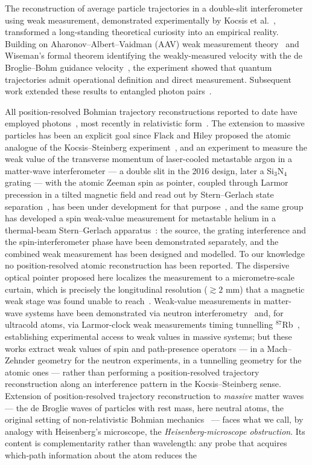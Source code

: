 \documentclass[11pt,a4paper]{article}
\begin{document}
The reconstruction of average particle trajectories in a double-slit interferometer using weak measurement, demonstrated experimentally by Kocsis et al.~\cite{Kocsis2011}, transformed a long-standing theoretical curiosity into an empirical reality. Building on Aharonov--Albert--Vaidman (AAV) weak measurement theory~\cite{AAV1988} and Wiseman's formal theorem identifying the weakly-measured velocity with the de Broglie--Bohm guidance velocity~\cite{Wiseman2007}, the experiment showed that quantum trajectories admit operational definition and direct measurement. Subsequent work extended these results to entangled photon pairs~\cite{Mahler2016, Xiao2017}.

All position-resolved Bohmian trajectory reconstructions reported to date have employed photons~\cite{Kocsis2011, Mahler2016, Xiao2017}, most recently in relativistic form~\cite{Wang2025}. The extension to massive particles has been an explicit goal since Flack and Hiley proposed the atomic analogue of the Kocsis--Steinberg experiment~\cite{FlackHiley2014}, and an experiment to measure the weak value of the transverse momentum of laser-cooled metastable argon in a matter-wave interferometer --- a double slit in the 2016 design, later a Si$_3$N$_4$ grating --- with the atomic Zeeman spin as pointer, coupled through Larmor precession in a tilted magnetic field and read out by Stern--Gerlach state separation~\cite{Morley2020}, has been under development for that purpose~\cite{Morley2016, Morley2020, Morley2021}, and the same group has developed a spin weak-value measurement for metastable helium in a thermal-beam Stern--Gerlach apparatus~\cite{Flack2018}: the source, the grating interference and the spin-interferometer phase have been demonstrated separately, and the combined weak measurement has been designed and modelled. To our knowledge no position-resolved atomic reconstruction has been reported. The dispersive optical pointer proposed here localizes the measurement to a micrometre-scale curtain, which is precisely the longitudinal resolution ($\gtrsim 2$ mm) that a magnetic weak stage was found unable to reach~\cite{Morley2020}. Weak-value measurements in matter-wave systems have been demonstrated via neutron interferometry~\cite{Sponar2015, Denkmayr2017, Lemmel2022} and, for ultracold atoms, via Larmor-clock weak measurements timing tunnelling $^{87}$Rb~\cite{Ramos2020, Spierings2021}, establishing experimental access to weak values in massive systems; but these works extract weak values of spin and path-presence operators --- in a Mach--Zehnder geometry for the neutron experiments, in a tunnelling geometry for the atomic ones --- rather than performing a position-resolved trajectory reconstruction along an interference pattern in the Kocsis--Steinberg sense. Extension of position-resolved trajectory reconstruction to \emph{massive} matter waves --- the de Broglie waves of particles with rest mass, here neutral atoms, the original setting of non-relativistic Bohmian mechanics~\cite{Bohm1952a, deBroglie1927, Holland1993} --- faces what we call, by analogy with Heisenberg's microscope, the \emph{Heisenberg-microscope obstruction}. Its content is complementarity rather than wavelength: any probe that acquires which-path information about the atom reduces the 
\end{document}
